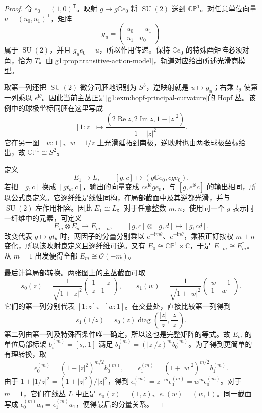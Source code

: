 \begin{proof}
	令 \(e_0=(1,0)^{\mathsf T}\)。映射 \(g\mapsto g\mathbb Ce_0\) 将 \(\operatorname{SU}(2)\) 送到 \(\mathbb{CP}^1\)。对任意单位向量 \(u=(u_0,u_1)^{\mathsf T}\)，矩阵
	\[
		g_u=\begin{pmatrix}u_0&-\overline{u_1}\\u_1&\overline{u_0}\end{pmatrix}
	\]
	属于 \(\operatorname{SU}(2)\)，并且 \(g_ue_0=u\)，所以作用传递。保持 \(\mathbb Ce_0\) 的特殊酉矩阵必须对角，恰为 \(T\)。由\cref{g1:prop:transitive-action-model}，轨道对应给出所述光滑商模型。

	取第一列还把 \(\operatorname{SU}(2)\) 微分同胚地识别为 \(S^3\)，逆映射就是 \(u\mapsto g_u\)；右乘 \(t_\theta\) 使第一列乘以 \(e^{\mathrm{i}\theta}\)。因此当前主丛正是\cref{g1:exm:hopf-principal-curvature}的 Hopf 丛。该例中的球极坐标同胚在这里写成
	\[
		[1:z]\longmapsto
		\frac{(2\operatorname{Re}z,2\operatorname{Im}z,1-|z|^2)}{1+|z|^2}.
	\]
	它在另一图 \([w:1]\)、\(w=1/z\) 上光滑延拓到南极，逆映射也由两张球极坐标给出，故 \(\mathbb{CP}^1\cong S^2\)。

	定义
	\[
		E_1\longrightarrow L,\qquad
		[g,c]\longmapsto(g\mathbb Ce_0,cge_0).
	\]
	若把 \([g,c]\) 换成 \([gt_\theta,c]\)，输出的向量变成 \(ce^{\mathrm{i}\theta}ge_0\)，与 \([g,e^{\mathrm{i}\theta}c]\) 的输出相同，所以公式良定义。它逐纤维是线性同构，在局部截面中及其逆都光滑，并与 \(\operatorname{SU}(2)\) 左作用相容。因此 \(E_1\cong L\)。对于任意整数 \(m,n\)，使用同一个 \(g\) 表示同一纤维中的元素，可定义
	\[
		E_m\otimes E_n\longrightarrow E_{m+n},\qquad
		[g,c]\otimes[g,d]\longmapsto[g,cd].
	\]
	改变代表 \(g\mapsto gt_\theta\) 时，两因子的分量分别乘以 \(e^{-\mathrm{i}m\theta}\)、\(e^{-\mathrm{i}n\theta}\)，乘积正好按权 \(m+n\) 变化，所以该映射良定义且逐纤维可逆。又有 \(E_0\cong\mathbb{CP}^1\times\mathbb C\)，于是 \(E_{-m}\cong E_m^*\)。从 \(m=1\) 出发便得全部 \(E_m\cong\mathcal O(-m)\)。

	最后计算局部转换。两张图上的主丛截面可取
	\[
		s_0(z)=\frac1{\sqrt{1+|z|^2}}
		\begin{pmatrix}1&-\overline z\\z&1\end{pmatrix},\qquad
		s_1(w)=\frac1{\sqrt{1+|w|^2}}
		\begin{pmatrix}w&-1\\1&\overline w\end{pmatrix}.
	\]
	它们的第一列分别代表 \([1:z]\)、\([w:1]\)。在交叠处，直接比较第一列得到
	\[
		s_1(1/z)=s_0(z)
		\operatorname{diag}\!\left(\frac{|z|}{z},\frac{z}{|z|}\right).
	\]
	第二列由第一列及特殊酉条件唯一确定，所以这也是完整矩阵的等式。故 \(E_m\) 的单位局部标架 \(b_i^{(m)}=[s_i,1]\) 满足
	\(b_1^{(m)}=(|z|/z)^m b_0^{(m)}\)。为了得到更简单的有理转换，取
	\[
		\epsilon_0^{(m)}=(1+|z|^2)^{m/2}b_0^{(m)},\qquad
		\epsilon_1^{(m)}=(1+|w|^2)^{m/2}b_1^{(m)}.
	\]
	由于 \(1+|1/z|^2=(1+|z|^2)/|z|^2\)，得到 \(\epsilon_1^{(m)}=z^{-m}\epsilon_0^{(m)}=w^m\epsilon_0^{(m)}\)。对于 \(m=1\)，它们在线丛 \(L\) 中正是 \(e_0(z)=(1,z)\)、\(e_1(w)=(w,1)\)。同一截面写成 \(\epsilon_0^{(m)}a_0=\epsilon_1^{(m)}a_1\)，便得最后的分量关系。
\end{proof}

